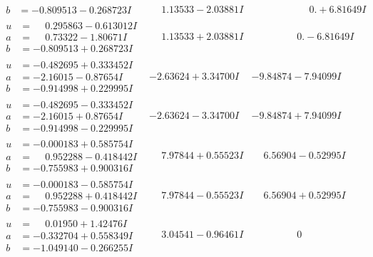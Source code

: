 \documentclass[1p]{elsarticle_modified}
\theoremstyle{definition}
\begin{document}
$$\begin{array}{c|c|c}
\begin{aligned}
b &= -0.809513 - 0.268723 I\end{aligned}
 & \phantom{-}1.13533 - 2.03881 I & \phantom{-0.000000 -}0. + 6.81649 I \\ \hline\begin{aligned}
u &= \phantom{-}0.295863 - 0.613012 I \\
a &= \phantom{-}0.73322 - 1.80671 I \\
b &= -0.809513 + 0.268723 I\end{aligned}
 & \phantom{-}1.13533 + 2.03881 I & \phantom{-0.000000 } 0. - 6.81649 I \\ \hline\begin{aligned}
u &= -0.482695 + 0.333452 I \\
a &= -2.16015 - 0.87654 I \\
b &= -0.914998 + 0.229995 I\end{aligned}
 & -2.63624 + 3.34700 I & -9.84874 - 7.94099 I \\ \hline\begin{aligned}
u &= -0.482695 - 0.333452 I \\
a &= -2.16015 + 0.87654 I \\
b &= -0.914998 - 0.229995 I\end{aligned}
 & -2.63624 - 3.34700 I & -9.84874 + 7.94099 I \\ \hline\begin{aligned}
u &= -0.000183 + 0.585754 I \\
a &= \phantom{-}0.952288 - 0.418442 I \\
b &= -0.755983 + 0.900316 I\end{aligned}
 & \phantom{-}7.97844 + 0.55523 I & \phantom{-}6.56904 - 0.52995 I \\ \hline\begin{aligned}
u &= -0.000183 - 0.585754 I \\
a &= \phantom{-}0.952288 + 0.418442 I \\
b &= -0.755983 - 0.900316 I\end{aligned}
 & \phantom{-}7.97844 - 0.55523 I & \phantom{-}6.56904 + 0.52995 I \\ \hline\begin{aligned}
u &= \phantom{-}0.01950 + 1.42476 I \\
a &= -0.332704 + 0.558349 I \\
b &= -1.049140 - 0.266255 I\end{aligned}
 & \phantom{-}3.04541 - 0.96461 I & \phantom{-0.000000 } 0 \\ \hline\begin{aligned}

\end{aligned}
\end{array}$$
\end{document}
